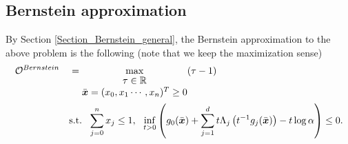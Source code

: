 \documentclass[10pt]{article}
\theoremstyle{definition}
\theoremstyle{plain}
\begin{document}
\subsection{Bernstein approximation}
By Section \ref{Section_Bernstein_general}, the Bernstein approximation to the above problem is the following (note that we keep the maximization sense)
\begin{align} \label{Bernstein_approx_direct_form}
\begin{split}
\mathcal{O}^{Bernstein}\quad &=\max_{\begin{matrix}
	\tau \in \mathbb{R}\\ 	
	\bar{\boldsymbol{x}} = (x_0, x_1\cdots,x_n)^T \geq 0
	\end{matrix}} (\tau - 1)\ \ \ \\
&\textnormal{s.t.}\ \ \sum_{j=0}^n x_j \leq 1,\ \ \inf_{t>0} \left(g_0(\bar{\boldsymbol{x}}) + \sum_{j=1}^d t \Lambda_j\left(t^{-1}g_j(\bar{\boldsymbol{x}})\right) - t\log \alpha \right) \leq 0.
\end{split}
\end{align}
\end{document}
